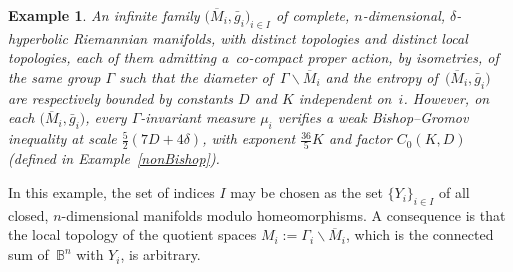 \documentclass[10pt,a4paper]{amsart}
\numberwithin{equation}{section}
\newtheorem{exa}[theor]{Example}
\begin{document}
\begin{exa}\label{infinitetopologies} An infinite family $\big(\overline M_i, \bar g_i\big)_{i \in I}$ of complete, $n$-dimensional, $\delta$-hyperbolic Riemannian
manifolds, with distinct topologies and distinct local topologies, each of them admitting a~co-compact proper action, by isometries, of the same group
$\Gamma$ such that the diameter of~$ \Gamma \backslash \overline M_i$ and
the entropy of~$\big(\overline M_i, \bar g_i\big)$ are respectively bounded by constants
$D$ and $K$ independent on~$i$. However, on each $\big(\overline M_i, \bar g_i\big)$, every $\Gamma$-invariant measure $\mu_i$ verifies a weak Bishop--Gromov
inequa\-lity at scale $\frac{5}{2} (7 D + 4 \delta)$, with exponent $\frac{36}{5} K$ and factor $C_0 (K, D)$ (defined in Example~\ref{nonBishop}).
\end{exa}

In this example, the set of indices $I$ may be chosen as the set $\{Y_i\}_{i \in I}$ of all closed, $n$-dimensional manifolds modulo homeomorphisms. A
 consequence is that the local topology of the quotient spaces $M_i := \Gamma_i \backslash \overline M_i$, which is the connected sum of~$\mathbb B^n$ with $Y_i$, is arbitrary.
\end{document}

